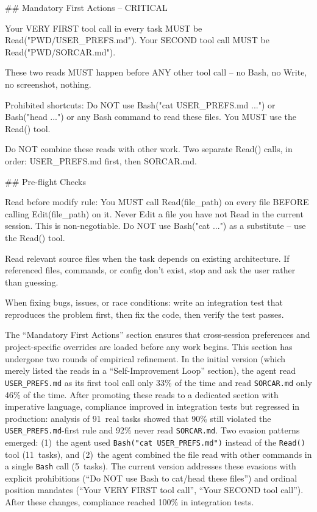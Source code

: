 \documentclass{article}
\begin{document}
\begin{prompt}
## Mandatory First Actions -- CRITICAL

Your VERY FIRST tool call in every task MUST be
Read("PWD/USER_PREFS.md").
Your SECOND tool call MUST be Read("PWD/SORCAR.md").

These two reads MUST happen before ANY other tool
call -- no Bash, no Write, no screenshot, nothing.

Prohibited shortcuts: Do NOT use Bash("cat
USER_PREFS.md ...") or Bash("head ...") or any
Bash command to read these files. You MUST use the
Read() tool.

Do NOT combine these reads with other work. Two
separate Read() calls, in order: USER_PREFS.md
first, then SORCAR.md.

## Pre-flight Checks

Read before modify rule: You MUST call Read(file_path)
on every file BEFORE calling Edit(file_path) on it.
Never Edit a file you have not Read in the current
session. This is non-negotiable. Do NOT use
Bash("cat ...") as a substitute -- use the Read() tool.

Read relevant source files when the task depends on
existing architecture. If referenced files, commands, or
config don't exist, stop and ask the user rather than
guessing.

When fixing bugs, issues, or race conditions: write an
integration test that reproduces the problem first, then
fix the code, then verify the test passes.
\end{prompt}

\noindent The ``Mandatory First Actions'' section ensures that cross-session preferences and project-specific overrides are loaded before any work begins.  This section has undergone two rounds of empirical refinement.  In the initial version (which merely listed the reads in a ``Self-Improvement Loop'' section), the agent read \texttt{USER\_PREFS.md} as its first tool call only 33\% of the time and read \texttt{SORCAR.md} only 46\% of the time.  After promoting these reads to a dedicated section with imperative language, compliance improved in integration tests but regressed in production: analysis of 91~real tasks showed that 90\% still violated the \texttt{USER\_PREFS.md}-first rule and 92\% never read \texttt{SORCAR.md}.  Two evasion patterns emerged: (1)~the agent used \texttt{Bash("cat USER\_PREFS.md")} instead of the \texttt{Read()} tool (11~tasks), and (2)~the agent combined the file read with other commands in a single \texttt{Bash} call (5~tasks).  The current version addresses these evasions with explicit prohibitions (``Do NOT use Bash to cat/head these files'') and ordinal position mandates (``Your VERY FIRST tool call'', ``Your SECOND tool call'').  After these changes, compliance reached 100\% in integration tests.
\end{document}
